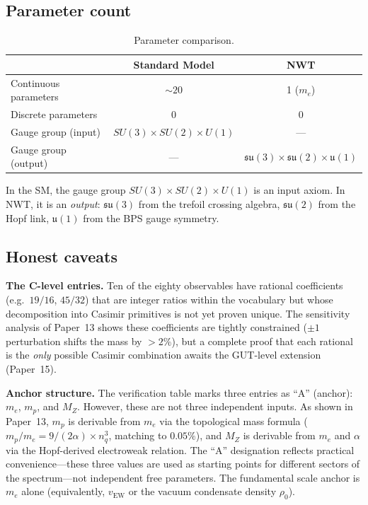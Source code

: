\documentclass[11pt]{article}
\newcommand{\su}{\mathfrak{su}}
\newcommand{\uu}{\mathfrak{u}}
\begin{document}
\subsection{Parameter count}

\begin{table}[h]
\centering
\caption{Parameter comparison.}
\label{tab:param-count}
\begin{tabular}{lcc}
\toprule
 & Standard Model & NWT \\
\midrule
Continuous parameters & $\sim 20$ & 1 ($m_e$)\\
Discrete parameters   & 0         & 0\\
Gauge group (input)   & $SU(3) \times SU(2) \times U(1)$ & ---\\
Gauge group (output)  & --- & $\su(3) \times \su(2) \times \uu(1)$\\
\bottomrule
\end{tabular}
\end{table}

In the SM, the gauge group $SU(3) \times SU(2) \times U(1)$ is an
input axiom.  In NWT, it is an \emph{output}: $\su(3)$ from the
trefoil crossing algebra, $\su(2)$ from the Hopf link, $\uu(1)$
from the BPS gauge symmetry.

\subsection{Honest caveats}

\textbf{The C-level entries.}
Ten of the eighty observables have rational coefficients (e.g.\
$19/16$, $45/32$) that are integer ratios within the vocabulary
but whose decomposition into Casimir primitives is not yet
proven unique.  The sensitivity analysis of Paper~13 shows these
coefficients are tightly constrained ($\pm 1$ perturbation shifts
the mass by $> 2\%$), but a complete proof that each rational is
the \emph{only} possible Casimir combination awaits the GUT-level
extension (Paper~15).

\textbf{Anchor structure.}
The verification table marks three entries as ``A'' (anchor):
$m_e$, $m_p$, and $M_Z$.  However, these are not three
independent inputs.  As shown in Paper~13, $m_p$ is derivable
from $m_e$ via the topological mass formula ($m_p/m_e =
9/(2\alpha) \times n_q^3$, matching to $0.05\%$), and
$M_Z$ is derivable from $m_e$ and $\alpha$ via the Hopf-derived
electroweak relation.  The ``A'' designation reflects practical
convenience---these three values are used as starting points for
different sectors of the spectrum---not independent free parameters.
The fundamental scale anchor is $m_e$ alone (equivalently,
$v_\text{EW}$ or the vacuum condensate density $\rho_0$).
\end{document}
